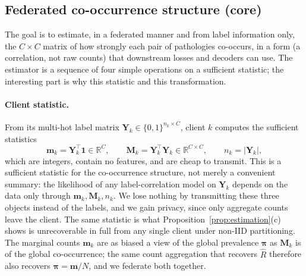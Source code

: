 \documentclass[11pt,a4paper]{article}
\theoremstyle{definition}
\newcommand{\Rhat}{\widehat{R}}
\begin{document}
\subsection{Federated co-occurrence structure (core)}
\label{sec:cooc}

The goal is to estimate, in a federated manner and from label information only, the $C\times C$ matrix of how strongly each pair of pathologies co-occurs, in a form (a correlation, not raw counts) that downstream losses and decoders can use. The estimator is a sequence of four simple operations on a sufficient statistic; the interesting part is why this statistic and this transformation.

\paragraph{Client statistic.} From its multi-hot label matrix $\mathbf{Y}_k\in\{0,1\}^{n_k\times C}$, client $k$ computes the sufficient statistics
\begin{equation}
\mathbf{m}_k=\mathbf{Y}_k^{\top}\mathbf{1}\in\mathbb{R}^{C},\qquad
\mathbf{M}_k=\mathbf{Y}_k^{\top}\mathbf{Y}_k\in\mathbb{R}^{C\times C},\qquad
n_k=|\mathbf{Y}_k|,
\label{eq:suffstat}
\end{equation}
which are integers, contain no features, and are cheap to transmit. This is a sufficient statistic for the co-occurrence structure, not merely a convenient summary: the likelihood of any label-correlation model on $\mathbf{Y}_k$ depends on the data only through $\mathbf{m}_k,\mathbf{M}_k,n_k$. We lose nothing by transmitting these three objects instead of the labels, and we gain privacy, since only aggregate counts leave the client. The same statistic is what Proposition~\ref{prop:estimation}(c) shows is unrecoverable in full from any single client under non-IID partitioning. The marginal counts $\mathbf{m}_k$ are as biased a view of the global prevalence $\boldsymbol\pi$ as $\mathbf{M}_k$ is of the global co-occurrence; the same count aggregation that recovers $\Rhat$ therefore also recovers $\boldsymbol\pi=\mathbf{m}/N$, and we federate both together.
\end{document}

